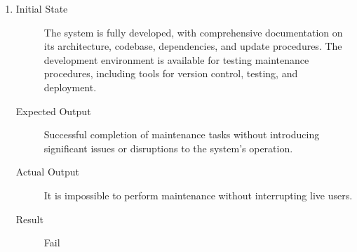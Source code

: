 \documentclass[12pt, titlepage]{article}
\begin{document}
\begin{enumerate}[NFR-T1]
  \item \label{NFRT19}
    \begin{description}
    \item[Initial State] The system is fully developed, with comprehensive
      documentation on its architecture, codebase, dependencies, and update
      procedures. The development environment is available for testing maintenance
      procedures, including tools for version control, testing, and deployment.
    \item[Expected Output] Successful completion of maintenance tasks without
    introducing significant issues or disruptions to the system's operation.
    \item[Actual Output] It is impossible to perform maintenance without 
    interrupting live users.
    \item[Result] Fail 
    \end{description}
  

\end{enumerate}
\end{document}
